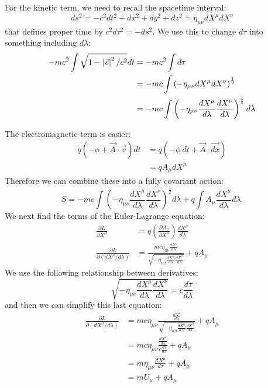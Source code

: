 \documentclass[../Main.tex]{subfiles}
\begin{document}
For the kinetic term, we need to recall the spacetime interval:
\begin{equation*}
    ds^2 = -c^2 dt^2 + dx^2 + dy^2 + dz^2 = \eta_{\mu\nu} dX^\mu dX^\nu
\end{equation*}
that defines proper time by $c^2 d\tau^2 = -ds^2$. We use this to change $d\tau$ into something including $d\lambda$:
\begin{align*}
    -mc^2 \int \sqrt{1 - \left|\vec{v}\right|^2 / c^2} dt &= -mc^2 \int d\tau \\
    &= -mc \int \left(-\eta_{\mu\nu} dX^\mu dX^\nu\right)^\frac12 \\
    &= -mc \int \left(-\eta_{\mu\nu} \frac{dX^\mu}{d\lambda} \frac{dX^\nu}{d\lambda}\right)^\frac12d\lambda
\end{align*}

The electromagnetic term is easier:
\begin{align*}
    q(-\phi + \vec{A} \cdot \vec{v}) dt&= q(-\phi~dt + \vec{A} \cdot \vec{dx}) \\
    &= q A_\mu dX^\mu
\end{align*}
Therefore we can combine these into a fully covariant action:
\begin{equation*}
    S = -mc \int \left(-\eta_{\mu\nu} \frac{dX^\mu}{d\lambda} \frac{dX^\nu}{d\lambda}\right)^\frac12d\lambda + q \int A_\mu \frac{dX^\mu}{d\lambda} d\lambda.
\end{equation*}
We next find the terms of the Euler-Lagrange equation:
\begin{align*}
    \frac{\partial L}{\partial X^\mu} &= q \left(\frac{\partial A_\nu}{\partial X^\mu}\right) \frac{dX^\nu}{d\lambda} \\
    \frac{\partial L}{\partial \left(dX^\mu / d\lambda\right)} &= \frac{mc \eta_{\mu\nu} \frac{dX^\nu}{d\lambda}}{\sqrt{-\eta_{\alpha\beta}\frac{dX^\alpha}{d\lambda} \frac{dX^\beta}{d\lambda}}} + qA_\mu
\end{align*}
We use the following relationship between derivatives:
\begin{equation*}
    \sqrt{-\eta_{\mu\nu} \frac{dX^\mu}{d\lambda} \frac{dX^\nu}{d\lambda}} = c \frac{d\tau}{d\lambda}
\end{equation*}
and then we can simplify this last equation:
\begin{align*}
    \frac{\partial L}{\partial \left(dX^\mu / d\lambda\right)} &= mc \eta_{\mu\nu} \frac{\frac{dX^\nu}{d\lambda}}{\sqrt{-\eta_{\alpha\beta}\frac{dX^\alpha}{d\lambda} \frac{dX^\beta}{d\lambda}}} + qA_\mu \\
    &= mc \eta_{\mu\nu} \frac{\frac{dX^\nu}{d\lambda}}{c \frac{d\tau}{d\lambda}} + qA_\mu \\
    &= m \eta_{\mu\nu} \frac{dX^\mu}{d\tau} + qA_\mu \\
    &= m U_\mu + q A_\mu
\end{align*}
\end{document}
